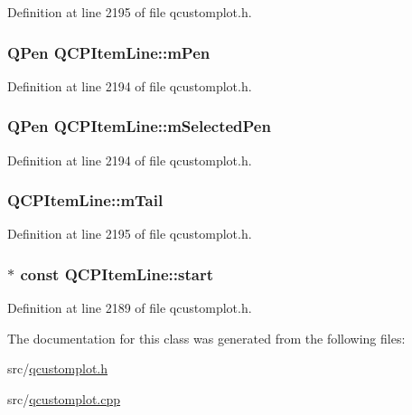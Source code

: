 Definition at line 2195 of file qcustomplot.\-h.

\hypertarget{class_q_c_p_item_line_abbb544d5bb927dfe4e81a7f3ca4c65ac}{
\subsubsection[{m\-Pen}]{\setlength{\rightskip}{0pt plus 5cm}Q\-Pen Q\-C\-P\-Item\-Line\-::m\-Pen\hspace{0.3cm}{\ttfamily [protected]}}}\label{class_q_c_p_item_line_abbb544d5bb927dfe4e81a7f3ca4c65ac}


Definition at line 2194 of file qcustomplot.\-h.

\hypertarget{class_q_c_p_item_line_aff858ad6dde3b90024814ca4b116f278}{
\subsubsection[{m\-Selected\-Pen}]{\setlength{\rightskip}{0pt plus 5cm}Q\-Pen Q\-C\-P\-Item\-Line\-::m\-Selected\-Pen\hspace{0.3cm}{\ttfamily [protected]}}}\label{class_q_c_p_item_line_aff858ad6dde3b90024814ca4b116f278}


Definition at line 2194 of file qcustomplot.\-h.

\hypertarget{class_q_c_p_item_line_ab8ed61dfe15bbb1cbf9b95eae95e242f}{
\subsubsection[{m\-Tail}]{ Q\-C\-P\-Item\-Line\-::m\-Tail\hspace{0.3cm}{\ttfamily [protected]}}}\label{class_q_c_p_item_line_ab8ed61dfe15bbb1cbf9b95eae95e242f}


Definition at line 2195 of file qcustomplot.\-h.

\hypertarget{class_q_c_p_item_line_a602da607a09498b0f152ada1d6851bc5}{
\subsubsection[{start}]{$\ast$ const Q\-C\-P\-Item\-Line\-::start}}\label{class_q_c_p_item_line_a602da607a09498b0f152ada1d6851bc5}


Definition at line 2189 of file qcustomplot.\-h.



The documentation for this class was generated from the following files\-:\begin{DoxyCompactItemize}
\item 
src/\hyperlink{qcustomplot_8h}{qcustomplot.\-h}\item 
src/\hyperlink{qcustomplot_8cpp}{qcustomplot.\-cpp}\end{DoxyCompactItemize}
